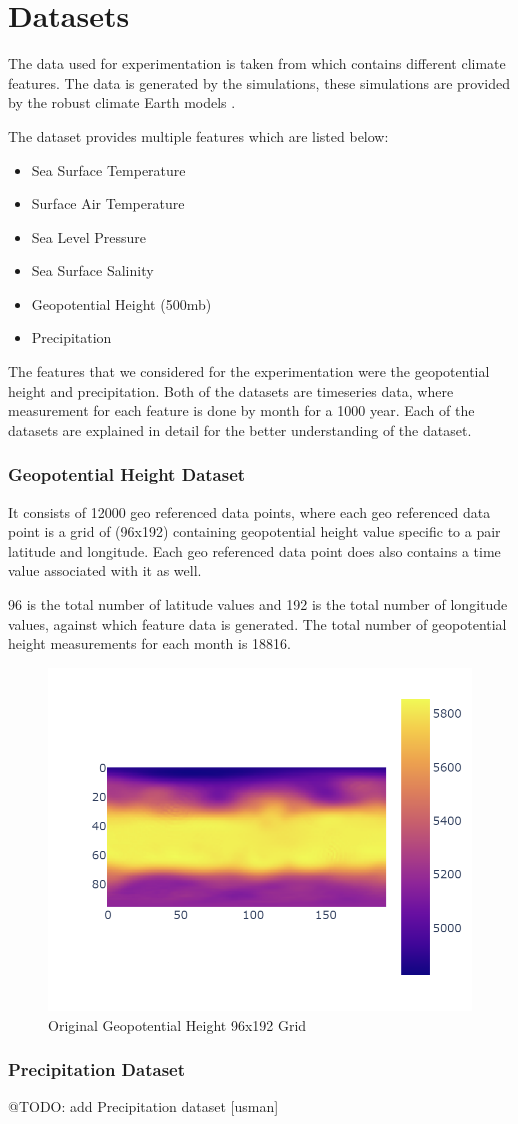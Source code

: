 
\clearpage
\cleardoublepage

\chapter{Datasets}
\label{chap:dataset}

The data used for experimentation is taken from \cite{willi_rath_2023_7779883} which contains different climate features. The data is generated by the simulations, these simulations are provided by the robust climate Earth models \cite{willi_rath_2023_7779883}.

The dataset provides multiple features which are listed below:
\begin{itemize}
    \item Sea Surface Temperature
    \item Surface Air Temperature
    \item Sea Level Pressure
    \item Sea Surface Salinity
    \item Geopotential Height (500mb)
    \item Precipitation
\end{itemize}

The features that we considered for the experimentation were the geopotential height and precipitation.
Both of the datasets are timeseries data, where measurement for each feature is done by month for a 1000 year. Each of the datasets are explained in detail for the better understanding of the dataset.
\subsection{Geopotential Height Dataset}
It consists of 12000 geo referenced data points, where each geo referenced data point is a grid of (96x192) containing geopotential height value specific to a pair latitude and longitude.
Each geo referenced data point does also contains a time value associated with it as well.

96  is the total number of latitude values and  192 is the total number of longitude values, against which feature data is generated. The total number of geopotential height measurements for each month is 18816.

\begin{figure}[H]
    \centering
    \includegraphics[width=0.6\linewidth]{figures/chapter-5/data_original.png}
    \caption{Original Geopotential Height 96x192 Grid }
    \label{fig:org_geopoth}
\end{figure}

\subsection{Precipitation Dataset}

@TODO: add Precipitation dataset [usman]